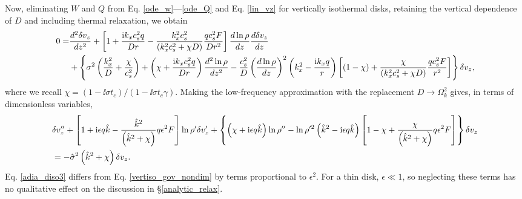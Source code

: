 Now, eliminating $W$ and $Q$ from Eq. \ref{ode_w}---\ref{ode_Q} and
Eq. \ref{lin_vz} for vertically isothermal disks, retaining the
vertical dependence of $D$ and including thermal relaxation, we
obtain 
\begin{align}
  0 =& \frac{d^2\delta v_z}{dz^2} + \left[1 + \frac{\mathrm{i} k_x c_s^2
      q}{Dr} - \frac{k_x^2c_s^2}{\left(k_x^2c_s^2 + \chi
        D\right)}\frac{qc_s^2F}{Dr^2}\right]\frac{d\ln\rho}{dz}\frac{d\delta
    v_z}{dz} \notag\\
  &+ \left\{\sigma^2\left(\frac{k_x^2}{D} +
      \frac{\chi}{c_s^2}\right) + \left(\chi + \frac{\mathrm{i} k_x c_s^2
        q}{Dr}\right)\frac{d^2\ln\rho}{dz^2} -
    \frac{c_s^2}{D}\left(\frac{d\ln\rho}{dz}\right)^2\left(k_x^2 -
      \frac{\mathrm{i} k_x q}{r}\right)
   \left[\left(1-\chi\right) +
     \frac{\chi}{\left(k_x^2c_s^2 + \chi D\right)}\frac{qc_s^2 F}{r^2}\right] 
   \right\}\delta v_z,
\end{align}
where we recall $\chi = \left(1-\ii\sigma t_c\right)/\left(1-\ii\sigma
t_c \gamma\right)$. Making the low-frequency approximation with the
replacement $D\to \Omega_k^2$ gives, in terms of dimensionless
variables,
\begin{align}
   &\delta v_z ^{\prime\prime} + \left[1 + \mathrm{i}\epsilon q\hat{k} -
    \frac{ \hat{k}^2}{
      \left(\hat{k}^2+\chi\right)}q \epsilon^2F\right]\ln\rho^{\prime}\delta v_z^\prime +
  \left\{\left(\chi + \mathrm{i} \epsilon q
      \hat{k}\right)\ln\rho^{\prime\prime} - \ln\rho^{\prime
      2}\left(\hat{k}^2 -
      \mathrm{i}\epsilon
      q\hat{k}\right)\left[1 - \chi +
      \frac{\chi}{\left(\hat{k}^2+\chi\right)}q\epsilon^2F\right]\right\}\delta v_z \notag\\&=
  -\hat{\sigma}^2\left(\hat{k}^2+\chi\right)\delta v_z\label{adia_diso3}.
\end{align}   
Eq. \ref{adia_diso3} differs from Eq. \ref{vertiso_gov_nondim} by terms
proportional to $\epsilon^2$. For a thin disk, $\epsilon\ll1$, so
neglecting these terms has no qualitative effect on the discussion in 
\S\ref{analytic_relax}.  %

